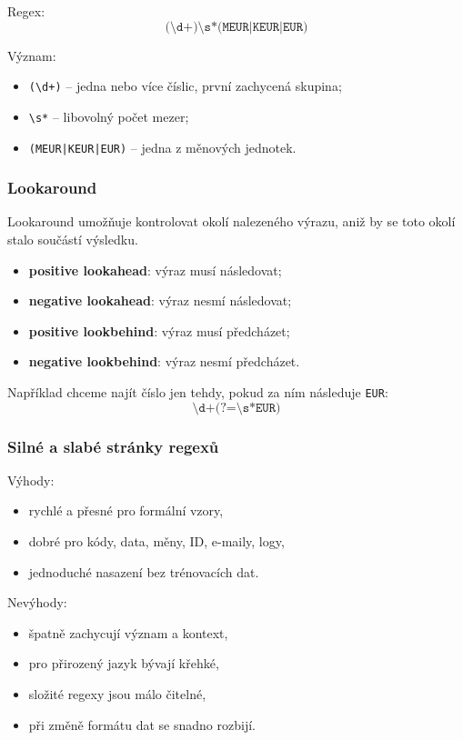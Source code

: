 Regex:
\[
\texttt{(\textbackslash d+)\textbackslash s*(MEUR|KEUR|EUR)}
\]

Význam:
\begin{itemize}
    \item \texttt{(\textbackslash d+)} -- jedna nebo více číslic, první zachycená skupina;
    \item \texttt{\textbackslash s*} -- libovolný počet mezer;
    \item \texttt{(MEUR|KEUR|EUR)} -- jedna z měnových jednotek.
\end{itemize}

\subsubsection{Lookaround}

Lookaround umožňuje kontrolovat okolí nalezeného výrazu, aniž by se toto okolí stalo součástí výsledku.

\begin{itemize}
    \item \textbf{positive lookahead}: výraz musí následovat;
    \item \textbf{negative lookahead}: výraz nesmí následovat;
    \item \textbf{positive lookbehind}: výraz musí předcházet;
    \item \textbf{negative lookbehind}: výraz nesmí předcházet.
\end{itemize}

Například chceme najít číslo jen tehdy, pokud za ním následuje \texttt{EUR}:
\[
\texttt{\textbackslash d+(?=\textbackslash s*EUR)}
\]

\subsubsection{Silné a slabé stránky regexů}

Výhody:
\begin{itemize}
    \item rychlé a přesné pro formální vzory,
    \item dobré pro kódy, data, měny, ID, e-maily, logy,
    \item jednoduché nasazení bez trénovacích dat.
\end{itemize}

Nevýhody:
\begin{itemize}
    \item špatně zachycují význam a kontext,
    \item pro přirozený jazyk bývají křehké,
    \item složité regexy jsou málo čitelné,
    \item při změně formátu dat se snadno rozbijí.
\end{itemize}

